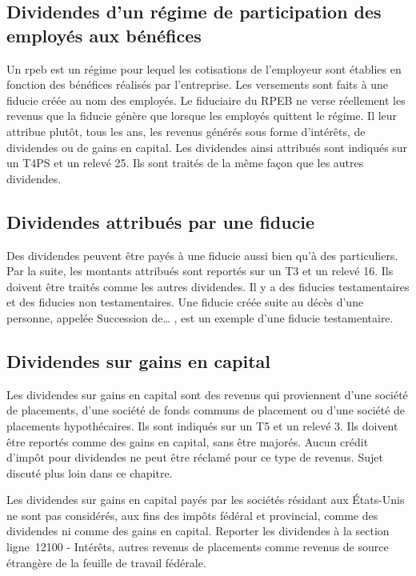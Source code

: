 \subsection{Dividendes d'un régime de participation des employés aux bénéfices}
Un \acrfull{rpeb} est un régime pour lequel les cotisations de l'employeur sont établies en fonction des bénéfices réalisés par l'entreprise. Les versements sont faits à une fiducie créée au nom des employés. Le fiduciaire du RPEB ne verse réellement les revenus que la fiducie génère que lorsque les employés quittent le régime. Il leur attribue plutôt, tous les ans, les revenus générés sous forme d'intérêts, de dividendes ou de gains en capital. Les dividendes ainsi attribués sont indiqués sur un T4PS et un relevé 25. Ils sont traités de la même façon que les autres dividendes.


\subsection{Dividendes attribués par une fiducie}
Des dividendes peuvent être payés à une fiducie aussi bien qu'à des particuliers. Par la suite, les montants attribués sont reportés sur un T3 et un relevé 16. Ils doivent être traités comme les autres dividendes. Il y a des fiducies testamentaires et des fiducies non testamentaires. Une fiducie créée suite au décès d'une personne, appelée \og Succession de\dots{} \fg{}, est un exemple d'une fiducie testamentaire.


\subsection{Dividendes sur gains en capital}
Les dividendes sur gains en capital sont des revenus qui proviennent d'une société de placements, d'une société de fonds communs de placement ou d'une société de placements hypothécaires. Ils sont indiqués sur un T5 et un relevé 3. Ils doivent être reportés comme des gains en capital, sans être majorés. Aucun crédit d'impôt pour dividendes ne peut être réclamé pour ce type de revenus. Sujet discuté plus loin dans ce chapitre.

Les dividendes sur gains en capital payés par les sociétés résidant aux États-Unis ne sont pas considérés, aux fins des impôts fédéral et provincial, comme des dividendes ni comme des gains en capital. Reporter les dividendes à la section  \og ligne~12100 - Intérêts, autres revenus de placements \fg{} comme revenus de source étrangère de la feuille de travail fédérale.


